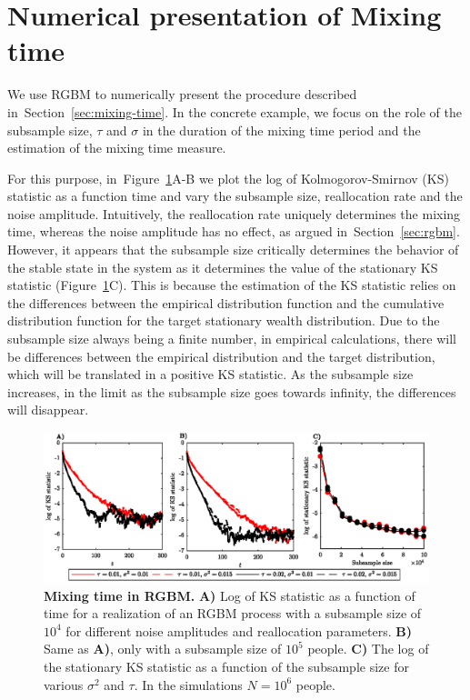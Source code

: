 \documentclass[11pt]{article}
\newcommand{\Sref}[1]{Section~\ref{sec:#1}}
\newcommand{\Fref}[1]{Figure~\ref{fig:#1}}
\numberwithin{equation}{section}
\begin{document}
\section{Numerical presentation of Mixing time}\label{sec:rgbm-numerical-mixing-time}

We use RGBM to numerically present the procedure described in~\Sref{mixing-time}. In the concrete example, we focus on the role of the subsample size, $\tau$ and $\sigma$ in the duration of the mixing time period and the estimation of the mixing time measure. 

For this purpose, in~\Fref{rgbm-mixing-time}A-B we plot the log of Kolmogorov-Smirnov (KS) statistic as a function time and vary the subsample size, reallocation rate and the noise amplitude. Intuitively, the reallocation rate uniquely determines the mixing time, whereas the noise amplitude has no effect, as argued in~\Sref{rgbm}. However, it appears that the subsample size critically determines the behavior of the stable state in the system as it determines the value of the stationary KS statistic (\Fref{rgbm-mixing-time}C). This is because the estimation of the KS statistic relies on the differences between the empirical distribution function and the cumulative distribution function for the target stationary wealth distribution. Due to the subsample size always being a finite number, in empirical calculations, there will be differences between the empirical distribution and the target distribution, which will be translated in a positive KS statistic. As the subsample size increases, in the limit as the subsample size goes towards infinity, the differences will disappear.

\begin{figure}[!htb]
\centering
\includegraphics[width=1.0\textwidth]{figs/fig_mixing_time_rgbm.eps}
\caption{\textbf{Mixing time in RGBM.} \textbf{A)} Log of KS statistic as a function of time for a realization of an RGBM process with a subsample size of $10^4$ for different noise amplitudes and reallocation parameters. \textbf{B)} Same as \textbf{A)}, only with a subsample size of $10^5$ people. \textbf{C)} The log of the stationary KS statistic as a function of the subsample size for various $\sigma^2$ and $\tau$. In the simulations $N = 10^6$ people. \label{fig:rgbm-mixing-time}}
\end{figure}
\end{document}
